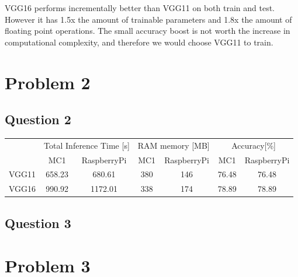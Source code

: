 \documentclass{article}
\begin{document}
VGG16 performs incrementally better than VGG11 on both train and test. However it has 1.5x the amount of trainable parameters and 1.8x the amount of floating point operations. 
The small accuracy boost is not worth the increase in computational complexity, and therefore we would choose VGG11 to train. 

\section*{Problem 2}
\subsection*{Question 2}
\begin{center}
\begin{tabular}{|*{7}{c|}}
    \hline
      & \multicolumn{2}{c|}{Total Inference Time [s]}  & \multicolumn{2}{c|}{RAM memory [MB]} & \multicolumn{2}{c|}{Accuracy[\%]} \\
    \cline{1-7}
      & MC1 & RaspberryPi & MC1 & RaspberryPi & MC1 & RaspberryPi \\
    \hline
    VGG11 & 658.23 & 680.61 & 380 & 146 & 76.48 & 76.48\\
    \hline
    VGG16 & 990.92 & 1172.01 & 338 & 174 & 78.89 & 78.89\\
    \hline
\end{tabular}
\end{center}

\subsection*{Question 3}
\section*{Problem 3}
\end{document}
